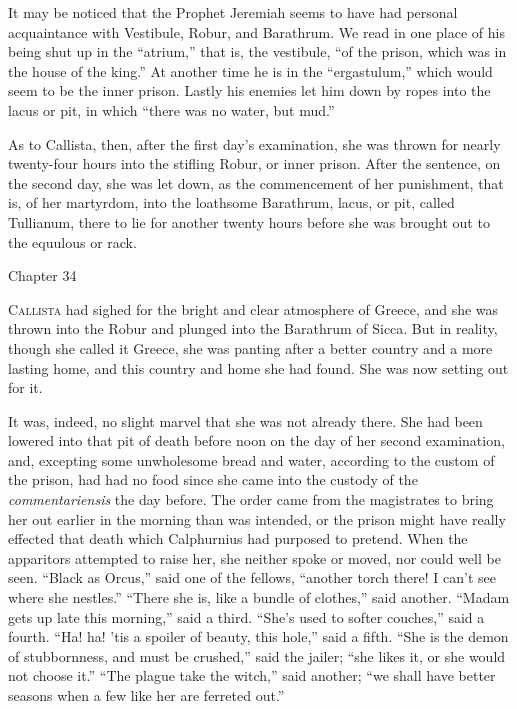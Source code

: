 It may be noticed that the Prophet Jeremiah seems to have had
personal acquaintance with Vestibule, Robur, and Barathrum. We read in
one place of his being shut up in the ``atrium,'' that is, the
vestibule, ``of the prison, which was in the house of the
king.'' At another time he is in the ``ergastulum,'' which
would seem to be the inner prison. Lastly his enemies let him down by
ropes into the lacus or pit, in which ``there was no water, but
mud.''

As to Callista, then, after the first day's examination, she was
thrown for nearly twenty-four hours into the stifling Robur, or inner
prison. After the sentence, on the second day, she was let down, as
the commencement of her punishment, that is, of her martyrdom, into
the loathsome Barathrum, lacus, or pit, called Tullianum, there to lie
for another twenty hours before she was brought out to the equulous or
rack.

Chapter 34


C\textsc{allista} had sighed for the bright and clear atmosphere of
Greece, and she was thrown into the Robur and plunged into the
Barathrum of Sicca. But in reality, though she called it Greece, she
was panting after a better country and a more lasting home, and this
country and home she had found. She was now setting out for it.

It was, indeed, no slight marvel that she was not already there.
She had been lowered into that pit of death before noon on the day of
her second examination, and, excepting some unwholesome bread and
water, according to the custom of the prison, had had no food since
she came into the custody of the \emph{commentariensis} the day
before. The order came from the magistrates to bring her out earlier
in the morning than was intended, or the prison might have really
effected that death which Calphurnius had purposed to pretend. When
the apparitors attempted to raise her, she neither spoke or moved, nor
could well be seen. ``Black as Orcus,'' said one of the
fellows, ``another torch there! I can't see where she
nestles.'' ``There she is, like a bundle of clothes,''
said another. ``Madam gets up late this morning,'' said a
third. ``She's used to softer couches,'' said a fourth.
``Ha! ha! 'tis a spoiler of beauty, this hole,'' said a
fifth. ``She is the demon of stubbornness, and must be
crushed,'' said the jailer; ``she likes it, or she would not
choose it.'' ``The plague take the witch,'' said another;
``we shall have better seasons when a few like her are ferreted
out.''

